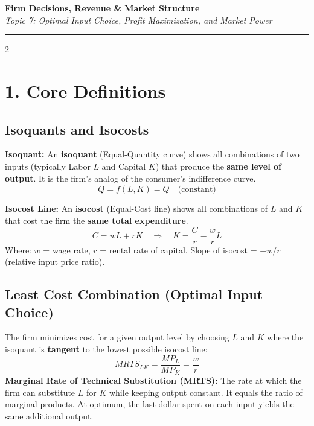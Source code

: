 \documentclass[10pt,a4paper]{article}
\begin{document}
\begin{center}
{\LARGE \textbf{Firm Decisions, Revenue \& Market Structure}}\\[0.15cm]
{\normalsize \textit{Topic 7: Optimal Input Choice, Profit Maximization, and Market Power}}\\[0.15cm]
\hrule
\end{center}
\vspace{-0.3cm}

\begin{multicols}{2}
\footnotesize

\section*{1. Core Definitions}

\subsection*{Isoquants and Isocosts}
\textbf{Isoquant:} An \textbf{isoquant} (Equal-Quantity curve) shows all combinations of two inputs (typically Labor $L$ and Capital $K$) that produce the \textbf{same level of output}. It is the firm's analog of the consumer's indifference curve.
\[
Q = f(L, K) = \bar{Q} \quad \text{(constant)}
\]

\textbf{Isocost Line:} An \textbf{isocost} (Equal-Cost line) shows all combinations of $L$ and $K$ that cost the firm the \textbf{same total expenditure}.
\[
C = wL + rK \quad \Rightarrow \quad K = \frac{C}{r} - \frac{w}{r}L
\]
Where: $w$ = wage rate, $r$ = rental rate of capital. Slope of isocost = $-w/r$ (relative input price ratio).

\subsection*{Least Cost Combination (Optimal Input Choice)}
The firm minimizes cost for a given output level by choosing $L$ and $K$ where the isoquant is \textbf{tangent} to the lowest possible isocost line:
\[
MRTS_{LK} = \frac{MP_L}{MP_K} = \frac{w}{r}
\]
\textbf{Marginal Rate of Technical Substitution (MRTS):} The rate at which the firm can substitute $L$ for $K$ while keeping output constant. It equals the ratio of marginal products. At optimum, the last dollar spent on each input yields the same additional output.


\end{multicols}
\end{document}

